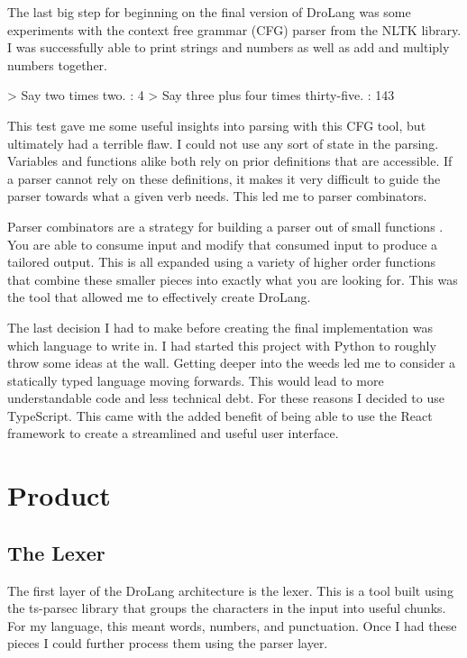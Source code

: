 \documentclass[titlepage]{article}
\newcommand{\langName}{DroLang}
\begin{document}
The last big step for beginning on the final version of \langName{} was some experiments with the context free grammar (CFG) parser from the NLTK library. I was successfully able to print strings and numbers as well as add and multiply numbers together.

\begin{codeblock}[caption={Initial CFG Sample},label={lst:CFGsample}]
> Say two times two.
: 4
> Say three plus four times thirty-five.
: 143
\end{codeblock}

This test gave me some useful insights into parsing with this CFG tool, but ultimately had a terrible flaw. I could not use any sort of state in the parsing. Variables and functions alike both rely on prior definitions that are accessible. If a parser cannot rely on these definitions, it makes it very difficult to guide the parser towards what a given verb needs. This led me to parser combinators.

Parser combinators are a strategy for building a parser out of small functions \cite{Hutton1996MonadicPC}. You are able to consume input and modify that consumed input to produce a tailored output. This is all expanded using a variety of higher order functions that combine these smaller pieces into exactly what you are looking for. This was the tool that allowed me to effectively create \langName{}.

The last decision I had to make before creating the final implementation was which language to write in. I had started this project with Python to roughly throw some ideas at the wall. Getting deeper into the weeds led me to consider a statically typed language moving forwards. This would lead to more understandable code and less technical debt. For these reasons I decided to use TypeScript. This came with the added benefit of being able to use the React framework to create a streamlined and useful user interface. 

\section*{Product}
\subsection*{The Lexer}
The first layer of the \langName{} architecture is the lexer. This is a tool built using the ts-parsec library that groups the characters in the input into useful chunks. For my language, this meant words, numbers, and punctuation. Once I had these pieces I could further process them using the parser layer.
\end{document}
